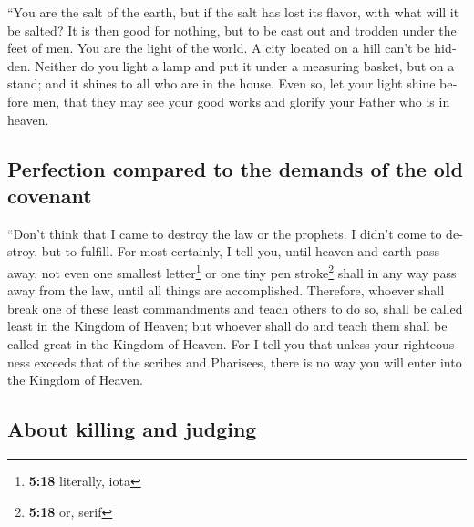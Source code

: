 \begin{paracol}{2}
\begin{otherlanguage}{english}
 ``You are the salt of the earth, but if the salt has
lost its flavor, with what will it be salted? It is then good for
nothing, but to be cast out and trodden under the feet of men.
 You are the light of the world. A city located on a hill
can't be hidden.  Neither do you light a lamp and put it
under a measuring basket, but on a stand; and it shines to all who are
in the house.  Even so, let your light shine before men,
that they may see your good works and glorify your Father who is in
heaven.

\hypertarget{perfection-compared-to-the-demands-of-the-old-covenant}{%
\subsection{Perfection compared to the demands of the old
covenant}\label{perfection-compared-to-the-demands-of-the-old-covenant}}

 ``Don't think that I came to destroy the law or the
prophets. I didn't come to destroy, but to fulfill.  For
most certainly, I tell you, until heaven and earth pass away, not even
one smallest letter\footnote{\textbf{5:18} literally, iota} or one tiny
pen stroke\footnote{\textbf{5:18} or, serif} shall in any way pass away
from the law, until all things are accomplished. 
Therefore, whoever shall break one of these least commandments and teach
others to do so, shall be called least in the Kingdom of Heaven; but
whoever shall do and teach them shall be called great in the Kingdom of
Heaven.  For I tell you that unless your righteousness
exceeds that of the scribes and Pharisees, there is no way you will
enter into the Kingdom of Heaven.

\hypertarget{about-killing-and-judging}{%
\subsection{About killing and judging}\label{about-killing-and-judging}}


\end{otherlanguage}
\end{paracol}
